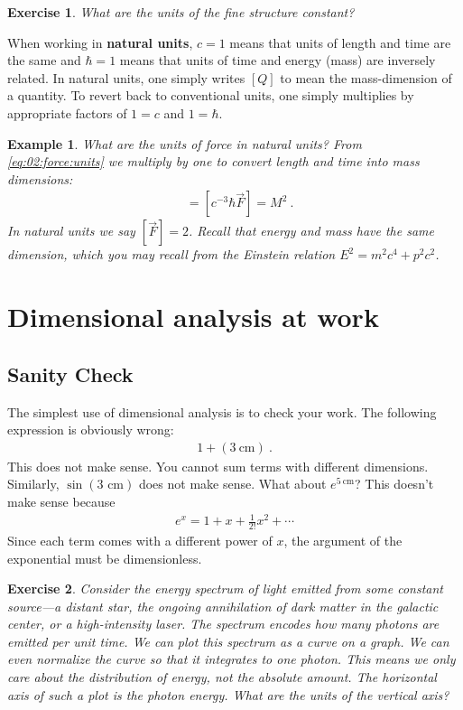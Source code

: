 \documentclass[
  11pt,
	colorful,
	raggedright,
]{tufte-style-thesis-flip}
\newtheorem{exercise}{Exercise}[section]
\newtheorem{example}{Example}[section]
\begin{document}
\begin{exercise}
What are the units of the fine structure constant?
\end{exercise}


When working in \textbf{natural units}, $c=1$ means that units of length and time are the same and $\hbar = 1$ means that units of time and energy (mass) are inversely related. In natural units, one simply writes $[Q]$ to mean the mass-dimension of a quantity. To revert back to conventional units, one simply multiplies by appropriate factors of $1=c$ and $1=\hbar$. 

\begin{example}
What are the units of force in natural units? From \eqref{eq:02:force:units} we multiply by one to convert length and time into mass dimensions:
\begin{align}
  [\vec F] &= [c^{-3} \hbar \vec{F}] = M^2 \ .
\end{align}
In natural units we say $[\vec F] = 2$. Recall that energy and mass have the same dimension, which you may recall from the Einstein relation $E^2 = m^2c^4 + p^2c^2$.
\end{example}

\section{Dimensional analysis at work}


\subsection{Sanity Check}

The simplest use of dimensional analysis is to check your work. The following expression is obviously wrong:
\begin{align}
  1 + (3~\text{cm}) \ .
\end{align}
This does not make sense. You cannot sum terms with different dimensions. Similarly, $\sin(3\text{ cm})$ does not make sense. What about $e^{5~\text{cm}}$? This doesn't make sense because
\begin{align}
  e^x = 1 + x + \frac{1}{2!} x^2 +  \cdots
\end{align}
Since each term comes with a different power of $x$, the argument of the exponential must be dimensionless. 

\begin{exercise}
Consider the energy spectrum of light emitted from some constant source---a distant star, the ongoing annihilation of dark matter in the galactic center, or a high-intensity laser. The spectrum encodes how many photons are emitted per unit time. We can plot this spectrum as a curve on a graph. We can even normalize the curve so that it integrates to one photon. This means we only care about the distribution of energy, not the absolute amount. The horizontal axis of such a plot is the photon energy. What are the units of the vertical axis?
\end{exercise}
\end{document}
